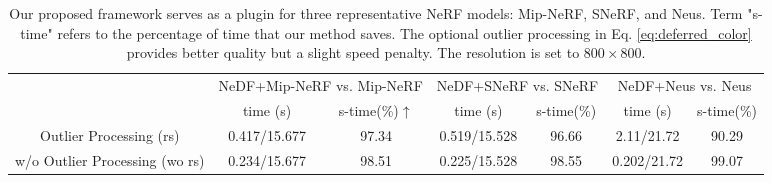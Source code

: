 \documentclass[letterpaper]{article} %
\begin{document}
\begin{table}[htbp]
\begin{center}
\begin{tabular}{c|cc|cc|cc}
\hline
 & \multicolumn{2}{c|}{NeDF+Mip-NeRF vs. Mip-NeRF } & \multicolumn{2}{c|}{NeDF+SNeRF vs. SNeRF} & \multicolumn{2}{c}{NeDF+Neus vs. Neus} \\ \cline{2-7}
 & time (s)   & s-time(\%)$\uparrow$   & time (s)   & s-time(\%)    &  time (s)  & s-time(\%)   \\ \hline
Outlier Processing (rs)    &0.417/15.677  & 97.34 & 0.519/15.528 & 96.66 & 2.11/21.72  & 90.29 \\
w/o Outlier Processing (wo rs) &0.234/15.677  & 98.51 & 0.225/15.528  & 98.55 & 0.202/21.72  & 99.07 \\ \hline
\end{tabular}
\caption{Our proposed framework serves as a plugin for three representative NeRF models: Mip-NeRF, SNeRF, and Neus. Term "s-time" refers to the percentage of time that our method saves. The optional outlier processing in Eq. \ref{eq:deferred_color} provides better quality but a slight speed penalty. The resolution is set to $800\times800$.}
\label{tab:3based}
\end{center}
\end{table}

\end{document}
